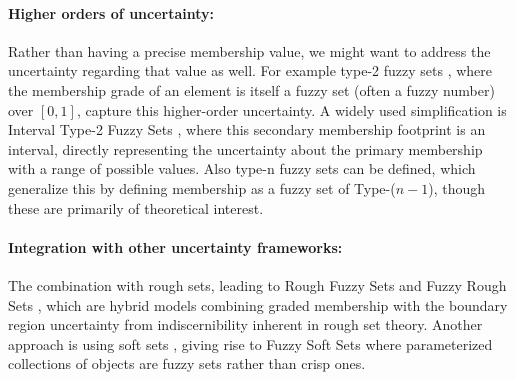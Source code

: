 \paragraph{Higher orders of uncertainty:} Rather than having a precise membership value, we might want to address the uncertainty regarding that value as well. For example type-2 fuzzy sets \cite{Zadeh1975}, where the membership grade of an element is itself a fuzzy set (often a fuzzy number) over $[0,1]$, capture this higher-order uncertainty. A widely used simplification is Interval Type-2 Fuzzy Sets \cite{Zadeh1975}, where this secondary membership footprint is an interval, directly representing the uncertainty about the primary membership with a range of possible values. Also type-n fuzzy sets \cite{Turksen1986_TypeNRelated} can be defined, which generalize this by defining membership as a fuzzy set of Type-($n-1$), though these are primarily of theoretical interest.

\paragraph{Integration with other uncertainty frameworks:} The combination with rough sets, leading to Rough Fuzzy Sets and Fuzzy Rough Sets \cite{DuboisPrade1990_FuzzyRough}, which are hybrid models combining graded membership with the boundary region uncertainty from indiscernibility inherent in rough set theory. Another approach is using soft sets \cite{Molodtsov1999_Soft}, giving rise to Fuzzy Soft Sets \cite{MajiBiswasRoy2001_FuzzySoft} where parameterized collections of objects are fuzzy sets rather than crisp ones. 


 


